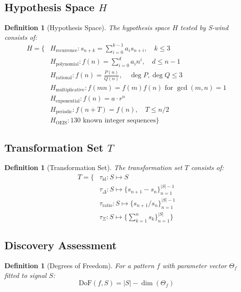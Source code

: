 \documentclass[11pt,a4paper]{article}
\newtheorem{definition}[theorem]{Definition}
\begin{document}
\subsection{Hypothesis Space $H$}

\begin{definition}[Hypothesis Space]
The hypothesis space $H$ tested by S-wind consists of:
\begin{align}
    H = \{ &H_{\text{recurrence}}: s_{n+k} = \sum_{i=0}^{k-1} a_i s_{n+i}, \quad k \leq 3 \\
           &H_{\text{polynomial}}: f(n) = \sum_{i=0}^{d} a_i n^i, \quad d \leq n-1 \\
           &H_{\text{rational}}: f(n) = \frac{P(n)}{Q(n)}, \quad \deg P, \deg Q \leq 3 \\
           &H_{\text{multiplicative}}: f(mn) = f(m)f(n) \text{ for } \gcd(m,n)=1 \\
           &H_{\text{exponential}}: f(n) = a \cdot r^n \\
           &H_{\text{periodic}}: f(n+T) = f(n), \quad T \leq n/2 \\
           &H_{\text{OEIS}}: \text{130 known integer sequences} \}
\end{align}
\end{definition}

\subsection{Transformation Set $T$}

\begin{definition}[Transformation Set]
The transformation set $T$ consists of:
\begin{align}
    T = \{ &\tau_{\text{id}}: S \mapsto S \\
           &\tau_{\Delta}: S \mapsto \{s_{n+1} - s_n\}_{n=1}^{|S|-1} \\
           &\tau_{\text{ratio}}: S \mapsto \{s_{n+1}/s_n\}_{n=1}^{|S|-1} \\
           &\tau_{\Sigma}: S \mapsto \{\sum_{k=1}^{n} s_k\}_{n=1}^{|S|} \}
\end{align}
\end{definition}

\subsection{Discovery Assessment}

\begin{definition}[Degrees of Freedom]
For a pattern $f$ with parameter vector $\Theta_f$ fitted to signal $S$:
\begin{equation}
    \text{DoF}(f, S) = |S| - \dim(\Theta_f)
\end{equation}
\end{definition}
\end{document}
